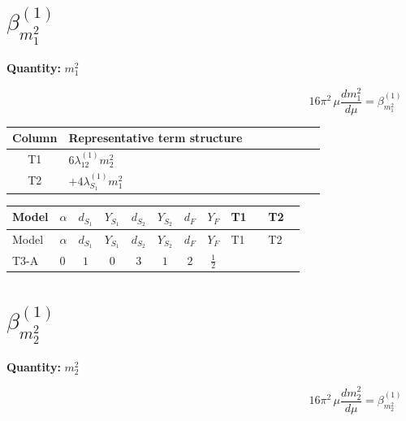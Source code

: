 \documentclass[8pt]{article}
\begin{document}
\begin{landscape}
\section*{$\beta_{m_1^2}^{(1)}$}
\noindent\textbf{Quantity: }$m_1^2$\par\smallskip
\[16\pi^2\,\mu\frac{d m_1^2}{d\mu}=\beta_{m_1^2}^{(1)}\]
\begin{center}
\begin{tabular}{@{}c >{\raggedright\arraybackslash}p{0.82\linewidth}@{}}
\toprule
Column & Representative term structure \\
\midrule
T1 & \(\displaystyle 6 {\lambda_{12}^{(1)}} {m_2^2}\) \\
\midrule
T2 & \(\displaystyle +4 {\lambda_{S_1}^{(1)}} {m_1^2}\) \\
\midrule
\bottomrule
\end{tabular}
\end{center}
\smallskip
\tiny
\begin{longtable}{@{}llcccccc >{\raggedright\arraybackslash}p{0.21\linewidth} >{\raggedright\arraybackslash}p{0.21\linewidth}@{}}
\toprule
Model & $\alpha$ & $d_{S_1}$ & $Y_{S_1}$ & $d_{S_2}$ & $Y_{S_2}$ & $d_F$ & $Y_F$ & T1 & T2 \\
\midrule
\endfirsthead
\toprule
Model & $\alpha$ & $d_{S_1}$ & $Y_{S_1}$ & $d_{S_2}$ & $Y_{S_2}$ & $d_F$ & $Y_F$ & T1 & T2 \\
\midrule
\endhead
T3-A & $0$ & $1$ & $0$ & $3$ & $1$ & $2$ & $\frac{1}{2}$ & \scriptsize\adjustbox{max width=\linewidth}{$\begin{gathered} 6 {\lambda_{12}^{(1)}} {m_2^2}\end{gathered}$} & \scriptsize\adjustbox{max width=\linewidth}{$\begin{gathered} +4 {\lambda_{S_1}^{(1)}} {m_1^2}\end{gathered}$} \\
\midrule
\bottomrule
\end{longtable}
\clearpage
\section*{$\beta_{m_2^2}^{(1)}$}
\noindent\textbf{Quantity: }$m_2^2$\par\smallskip
\[16\pi^2\,\mu\frac{d m_2^2}{d\mu}=\beta_{m_2^2}^{(1)}\]

\end{landscape}
\end{document}
